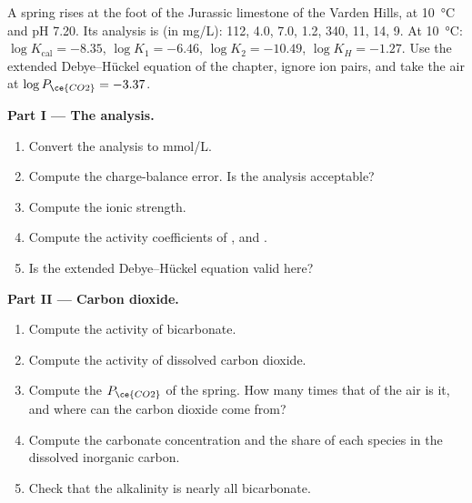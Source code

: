 \begin{problem}
\label{pb:b3:water-rock-interaction:1}
A spring rises at the foot of the Jurassic limestone of the Varden Hills, at
\qty{10}{\celsius} and pH 7.20. Its analysis is (in \unit{mg/L}): 
112,  4.0,  7.0,  1.2,  340,  11,
 14,  9. At \qty{10}{\celsius}: $\log K_{\mathrm{cal}} =
-8.35$, $\log K_1 = -6.46$, $\log K_2 = -10.49$, $\log K_H = -1.27$. Use the
extended Debye--Hückel equation of the chapter, ignore ion pairs, and take
the air at $\log P_{\ce{CO2}} = -3.37$.

\medskip\noindent\textbf{Part I --- The analysis.}
\begin{enumerate}
\item Convert the analysis to \unit{mmol/L}.
\item Compute the charge-balance error. Is the analysis acceptable?
\item Compute the ionic strength.
\item Compute the activity coefficients of ,  and
  .
\item Is the extended Debye--Hückel equation valid here?
\end{enumerate}

\medskip\noindent\textbf{Part II --- Carbon dioxide.}
\begin{enumerate}[resume]
\item Compute the activity of bicarbonate.
\item Compute the activity of dissolved carbon dioxide.
\item Compute the $P_{\ce{CO2}}$ of the spring. How many times that of the
  air is it, and where can the carbon dioxide come from?
\item Compute the carbonate concentration and the share of each species in
  the dissolved inorganic carbon.
\item Check that the alkalinity is nearly all bicarbonate.
\end{enumerate}


\end{problem}

